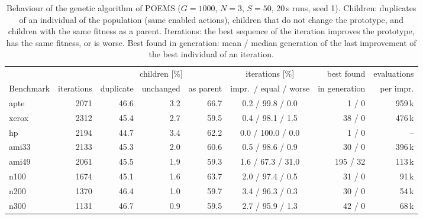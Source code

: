 \begin{table}
\centering
\footnotesize
\setlength{\tabcolsep}{2.5pt}
\begin{tabular}{@{}lrrrrcrr@{}}
\toprule
 & & \multicolumn{3}{c}{children [\%]} & iterations [\%] & best found & evaluations \\
Benchmark & iterations & duplicate & unchanged & as parent & impr.\ / equal / worse & in generation & per impr. \\
\midrule
apte & 2071 & 46.6 & 3.2 & 66.7 & 0.2 / 99.8 / 0.0 & 1 / 0 & 959\,k \\
xerox & 2312 & 45.4 & 2.7 & 59.5 & 0.4 / 98.1 / 1.5 & 38 / 0 & 476\,k \\
hp & 2194 & 44.7 & 3.4 & 62.2 & 0.0 / 100.0 / 0.0 & 1 / 0 & -- \\
ami33 & 2133 & 45.3 & 2.0 & 60.6 & 0.5 / 98.6 / 0.9 & 30 / 0 & 396\,k \\
ami49 & 2061 & 45.5 & 1.9 & 59.3 & 1.6 / 67.3 / 31.0 & 195 / 32 & 113\,k \\
n100 & 1674 & 45.1 & 1.6 & 63.7 & 2.0 / 97.4 / 0.5 & 31 / 0 & 91\,k \\
n200 & 1370 & 46.4 & 1.0 & 59.7 & 3.4 / 96.3 / 0.3 & 30 / 0 & 54\,k \\
n300 & 1131 & 46.7 & 0.9 & 59.5 & 2.7 / 95.9 / 1.3 & 42 / 0 & 68\,k \\
\bottomrule
\end{tabular}
\caption{Behaviour of the genetic algorithm of POEMS ($G = 1000$, $N = 3$, $S = 50$, 20\,s runs, seed 1). Children: duplicates of an individual of the population (same enabled actions), children that do not change the prototype, and children with the same fitness as a parent. Iterations: the best sequence of the iteration improves the prototype, has the same fitness, or is worse. Best found in generation: mean / median generation of the last improvement of the best individual of an iteration.}
\label{tab:gaanalysis}
\end{table}
